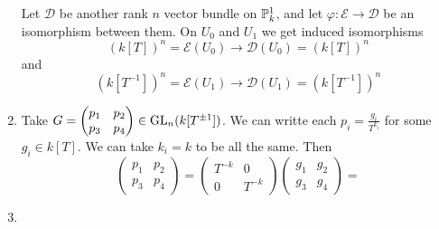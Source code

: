\begin{exercise}{2}
\begin{enumerate}
{            Let $\mathcal{D}$ be another rank $n$ vector bundle on $\mathbb{P}^1_k$,
            and let $\varphi \colon \mathcal{E} \to \mathcal{D}$ be an
            isomorphism between them.
            On $U_0$ and $U_1$ we get induced isomorphisms
            \begin{equation*}
                (k[T])^n = \mathcal{E}(U_0) \to \mathcal{D}(U_0) = (k[T])^n
            \end{equation*}
            and
            \begin{equation*}
                (k[T^{-1}])^n = \mathcal{E}(U_1) \to \mathcal{D}(U_1) = (k[T^{-1}])^n
            \end{equation*}
        }
    \item{
            Take $G = \begin{pmatrix} p_1 & p_2 \\ p_3 & p_4 \end{pmatrix} \in
                \operatorname{GL}_n(k[T^{\pm 1}])$. We can writte each $p_i =
                \frac{g_i}{T^{k_i}}$ for some $g_i \in k[T]$. We can take $k_i =
                k$ to be all the same. Then
                \begin{equation}
                    \begin{pmatrix} p_1 & p_2 \\ p_3 & p_4 \end{pmatrix} =
                        \begin{pmatrix} T^{-k} & 0 \\ 0 & T^{-k} \end{pmatrix} 
                    \begin{pmatrix} g_1 & g_2 \\ g_3 & g_4 \end{pmatrix} = 
                \end{equation}
        }
    \item{
        }
    \end{enumerate}
\end{exercise}


